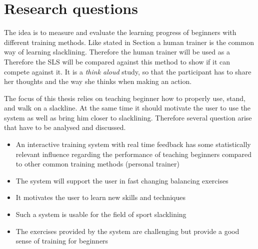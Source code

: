 \section{Research questions}

The idea is to measure and evaluate the learning progress of beginners with different training methods. Like stated in Section  a human trainer is the common way of learning slacklining. Therefore the human trainer will be used as a 
 Therefore the SLS will be compared against this method to show if it can compete against it. It is a \textit{think aloud} study, so that the participant has to share her thoughts and the way she thinks when making an action.

\todo{----------------}

The focus of this thesis relies on teaching beginner how to properly use, stand, and walk on a slackline. At the same time it should motivate the user to use the system as well as bring him closer to slacklining. Therefore several question arise that have to be analysed and discussed.

\begin{itemize}
\item An interactive training system with real time feedback has some statistically relevant influence regarding the performance of teaching beginners compared to other common training methods (personal trainer)
\item The system will support the user in fast changing balancing exercises
\item It motivates the user to learn new skills and techniques
\item Such a system is usable for the field of sport slacklining
\item The exercises provided by the system are challenging but provide a good sense of training for beginners
\end{itemize}
